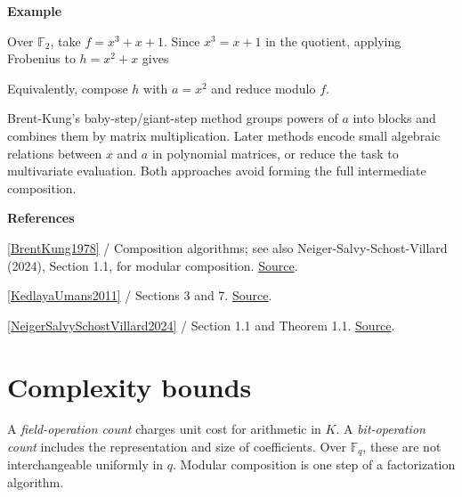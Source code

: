 \documentclass[11pt,a4paper,oneside,openany]{book}
\newcommand{\atlasdisplay}[1]{\par\begingroup\centering\vspace{3pt}\noindent\adjustbox{max width=\linewidth}{\(\displaystyle #1\)}\par\vspace{5pt}\endgroup}
\newenvironment{sources}{\par\smallskip\begingroup\footnotesize\color{atlasgray}\leftskip=10pt\setlength{\parskip}{2pt}}{\par\endgroup\smallskip}
\begin{document}
\begin{atlasblock}[standard]
\textbf{\sffamily Example}\par\smallskip
\color{black} Over \(\mathbb F_2\), take \(f=x^3+x+1\). Since \(x^3=x+1\) in the quotient, applying Frobenius to \(h=x^2+x\) gives\par

\atlasdisplay{h^2=x^4+x^2=(x^2+x)+x^2=x.}
\color{black} Equivalently, compose \(h\) with \(a=x^2\) and reduce modulo \(f\).\par
\end{atlasblock}\color{black}
\color{black} Brent-Kung's baby-step/giant-step method groups powers of \(a\) into blocks and combines them by matrix multiplication. Later methods encode small algebraic relations between \(x\) and \(a\) in polynomial matrices, or reduce the task to multivariate evaluation. Both approaches avoid forming the full intermediate composition.\par
\begin{sources}
\textbf{References}\par\smallskip
\noindent\hyperlink{ref:BrentKung1978}{[BrentKung1978]} / Composition algorithms; see also Neiger-Salvy-Schost-Villard (2024), Section 1.1, for modular composition.  \href{https://doi.org/10.1145/322092.322099}{Source}.\par
\noindent\hyperlink{ref:KedlayaUmans2011}{[KedlayaUmans2011]} / Sections 3 and 7.  \href{https://doi.org/10.1137/08073408X}{Source}.\par
\noindent\hyperlink{ref:NeigerSalvySchostVillard2024}{[NeigerSalvySchostVillard2024]} / Section 1.1 and Theorem 1.1.  \href{https://doi.org/10.1145/3638349}{Source}.\par
\end{sources}\color{black}
\section{Complexity bounds}
\color{black} A \emph{field-operation count} charges unit cost for arithmetic in \(K\). A \emph{bit-operation count} includes the representation and size of coefficients. Over \(\mathbb F_q\), these are not interchangeable uniformly in \(q\). Modular composition is one step of a factorization algorithm.\par
\end{document}
